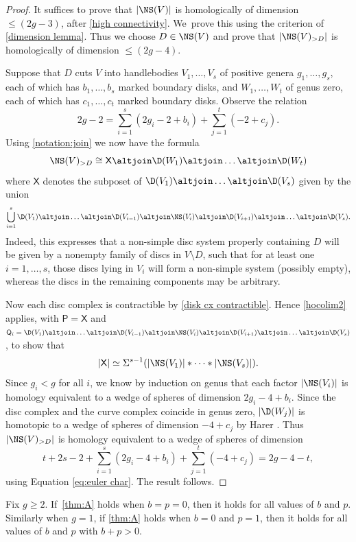 \begin{proof}It suffices to prove that $|\NS(V)|$ is homologically of dimension~$\leq (2g-3)$, after \cref{high connectivity}. We~prove this using the criterion of \cref{dimension lemma}. Thus we choose $D \in \NS(V)$ and prove that $|\NS(V)_{>D}|$ is homologically of dimension $\leq (2g-4)$.

Suppose that $D$ cuts $V$ into handlebodies $V_1,\dots,V_{s}$ of positive genera $g_1,\dots,g_s$, each of which has $b_1,\dots,b_s$ marked boundary disks, and $W_1,\dots,W_t$ of genus zero, each of which has $c_1,\dots,c_t$ marked boundary disks. Observe the relation
\begin{equation}\tag{$\star$}\label{eq:euler char}
2g-2 = \sum_{i=1}^s (2g_i - 2 + b_i) + \sum_{j=1}^t (-2+c_j).
\end{equation}
Using \cref{notation:join} we now have the formula
\[
\NS(V)_{>D} \cong \mathsf X \altjoin \D(W_1) \altjoin \dots \altjoin \D(W_t)
\]
where $\mathsf X$ denotes the subposet of $\D(V_1) \altjoin \dots \altjoin \D(V_s)$ given by the union
\[
\bigcup_{i=1}^s \D(V_1) \altjoin \dots \altjoin \D(V_{i-1}) \altjoin \NS(V_i) \altjoin \D(V_{i+1}) \altjoin \dots \altjoin \D(V_s).
\]Indeed, this expresses that a non-simple disc system properly containing $D$ will be given by a nonempty family of discs in $V \setminus D$, such that for at least one $i=1,\dots,s$, those discs lying in $V_i$ will form a non-simple system (possibly empty), whereas the discs in the remaining components may be arbitrary.

Now each disc complex is contractible by \cref{disk cx contractible}. Hence \cref{hocolim2} applies, with $\mathsf P = \mathsf X$ and $\mathsf Q_i = \D(V_1) \altjoin \dots \altjoin \D(V_{i-1}) \altjoin \NS(V_i) \altjoin \D(V_{i+1}) \altjoin \dots \altjoin \D(V_s)$, to show that
\[
|\mathsf X| \simeq \Sigma^{s-1} (|\NS(V_1)| \ast \dots \ast |\NS(V_s)|) .
\]
Since $g_i<g$ for all $i$, we know by induction on genus that each factor $|\NS(V_i)|$ is homology equivalent to a wedge of spheres of dimension $2g_i-4+b_i$. Since the disc complex and the curve complex coincide in genus zero, $|\D(W_j)|$ is homotopic to a wedge of spheres of dimension $-4+c_j$ by Harer \cite{harer}. Thus $|\NS(V)_{>D}|$ is homology equivalent to a wedge of spheres of dimension
\[
t+ 2s-2+ \sum_{i=1}^s (2g_i-4+b_i) + \sum_{j=1}^t (-4+c_j) = 2g-4-t,
\]
using Equation \eqref{eq:euler char}. The result follows. \end{proof}

\begin{prop}\label{birman trick} Fix $g \geq 2$. If~\cref{thm:A} holds when $b=p=0$, then it holds for all values of $b$ and $p$. Similarly when $g=1$, if \cref{thm:A} holds when $b=0$ and $p=1$, then it holds for all values of $b$ and $p$ with $b+p>0$.
\end{prop}

